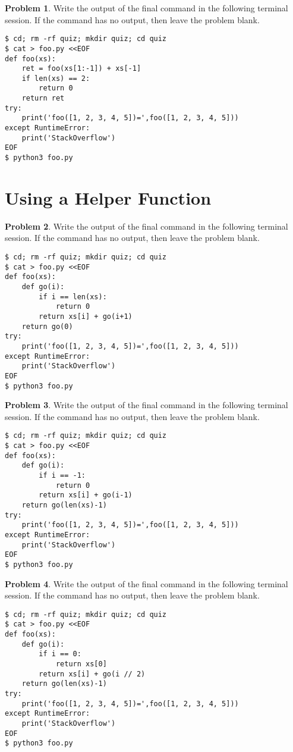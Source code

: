 \documentclass[10pt]{article}
\theoremstyle{definition}
\newtheorem{problem}{Problem}
\begin{document}
\filbreak
\begin{problem}
    Write the output of the final command in the following terminal session.
    If the command has no output, then leave the problem blank.
\end{problem}
\begin{lstlisting}
$ cd; rm -rf quiz; mkdir quiz; cd quiz
$ cat > foo.py <<EOF
def foo(xs):
    ret = foo(xs[1:-1]) + xs[-1]
    if len(xs) == 2:
        return 0
    return ret
try:
    print('foo([1, 2, 3, 4, 5])=',foo([1, 2, 3, 4, 5]))
except RuntimeError:
    print('StackOverflow')
EOF
$ python3 foo.py
\end{lstlisting}

\filbreak
\section{Using a Helper Function}

\begin{problem}
    Write the output of the final command in the following terminal session.
    If the command has no output, then leave the problem blank.
\end{problem}
\begin{lstlisting}
$ cd; rm -rf quiz; mkdir quiz; cd quiz
$ cat > foo.py <<EOF
def foo(xs):
    def go(i):
        if i == len(xs):
            return 0
        return xs[i] + go(i+1)
    return go(0)
try:
    print('foo([1, 2, 3, 4, 5])=',foo([1, 2, 3, 4, 5]))
except RuntimeError:
    print('StackOverflow')
EOF
$ python3 foo.py
\end{lstlisting}

\filbreak
\begin{problem}
    Write the output of the final command in the following terminal session.
    If the command has no output, then leave the problem blank.
\end{problem}
\begin{lstlisting}
$ cd; rm -rf quiz; mkdir quiz; cd quiz
$ cat > foo.py <<EOF
def foo(xs):
    def go(i):
        if i == -1:
            return 0
        return xs[i] + go(i-1)
    return go(len(xs)-1)
try:
    print('foo([1, 2, 3, 4, 5])=',foo([1, 2, 3, 4, 5]))
except RuntimeError:
    print('StackOverflow')
EOF
$ python3 foo.py
\end{lstlisting}


\filbreak
\begin{problem}
    Write the output of the final command in the following terminal session.
    If the command has no output, then leave the problem blank.
\end{problem}
\begin{lstlisting}
$ cd; rm -rf quiz; mkdir quiz; cd quiz
$ cat > foo.py <<EOF
def foo(xs):
    def go(i):
        if i == 0:
            return xs[0]
        return xs[i] + go(i // 2)
    return go(len(xs)-1)
try:
    print('foo([1, 2, 3, 4, 5])=',foo([1, 2, 3, 4, 5]))
except RuntimeError:
    print('StackOverflow')
EOF
$ python3 foo.py
\end{lstlisting}
\end{document}
